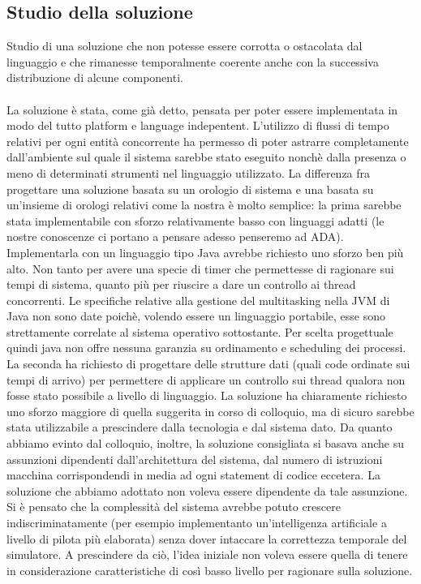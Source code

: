 \subsection{Studio della soluzione}
 Studio di una soluzione che non potesse essere corrotta o ostacolata dal linguaggio e che rimanesse temporalmente coerente anche con la successiva distribuzione di alcune componenti.\\\\
La soluzione è stata, come già detto, pensata per poter essere implementata in modo del tutto platform e language indepentent. L’utilizzo di flussi di tempo relativi per ogni entità concorrente ha permesso di poter astrarre completamente dall’ambiente sul quale il sistema sarebbe stato eseguito nonchè dalla presenza o meno di determinati strumenti nel linguaggio utilizzato.
La differenza fra progettare una soluzione basata su un orologio di sistema e una basata su un’insieme di orologi relativi come la nostra è molto semplice: la prima sarebbe stata implementabile con sforzo relativamente basso con linguaggi adatti (le nostre conoscenze ci portano a pensare adesso penseremo ad ADA). Implementarla con un linguaggio tipo Java avrebbe richiesto uno sforzo ben più alto. Non tanto per avere una specie di timer che permettesse di ragionare sui tempi di sistema, quanto più per riuscire a dare un controllo ai thread concorrenti. Le specifiche relative alla gestione del multitasking nella JVM di Java non sono date poichè, volendo essere un linguaggio portabile, esse sono strettamente correlate al sistema operativo sottostante. Per scelta progettuale quindi java non offre nessuna garanzia su ordinamento e scheduling dei processi.
La seconda ha richiesto di progettare delle strutture dati (quali code ordinate sui tempi di arrivo) per permettere di applicare un controllo sui thread qualora non fosse stato possibile a livello di linguaggio. La soluzione ha chiaramente richiesto uno sforzo maggiore di quella suggerita in corso di colloquio, ma di sicuro sarebbe stata utilizzabile a prescindere dalla tecnologia e dal sistema dato.
Da quanto abbiamo evinto dal colloquio, inoltre, la soluzione consigliata si basava anche su assunzioni dipendenti dall’architettura del sistema, dal numero di istruzioni macchina corrispondendi in media ad ogni statement di codice eccetera. La soluzione che abbiamo adottato non voleva essere dipendente da tale assunzione. Si è pensato che la complessità del sistema avrebbe potuto crescere indiscriminatamente (per esempio implementanto un’intelligenza artificiale a livello di pilota più elaborata) senza dover intaccare la correttezza temporale del simulatore.
A prescindere da ciò, l’idea iniziale non voleva essere quella di tenere in considerazione caratteristiche di così basso livello per ragionare sulla soluzione.
